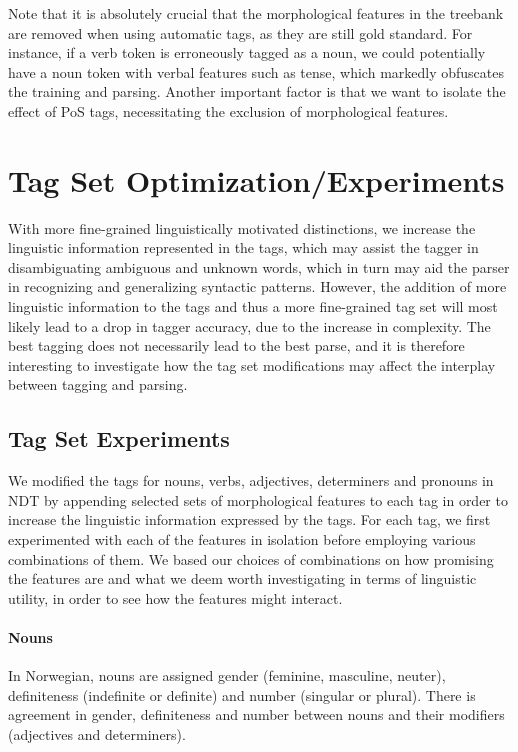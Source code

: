 \documentclass[11pt,a4paper]{article}
\begin{document}
Note that it is absolutely crucial that the morphological features in the
treebank are removed when using automatic tags, as they are still gold
standard. For instance, if a verb token is erroneously tagged as a noun, we
could potentially have a noun token with verbal features such as tense, which
markedly obfuscates the training and parsing. Another important factor is that
we want to isolate the effect of PoS tags, necessitating the exclusion of
morphological features.

\section{Tag Set Optimization/Experiments}
\label{sec:optimization}
With more fine-grained linguistically
motivated distinctions, we increase the linguistic information represented in
the tags, which may assist the tagger in disambiguating ambiguous and unknown
words, which in turn may aid the parser in recognizing and generalizing
syntactic patterns. However, the addition of more linguistic information to the
tags and thus a more fine-grained tag set will most likely lead to a drop in
tagger accuracy, due to the increase in complexity. The best tagging does not
necessarily lead to the best parse, and it is therefore interesting to
investigate how the tag set modifications may affect the interplay between
tagging and parsing.

\subsection{Tag Set Experiments}
We modified the tags for nouns, verbs, adjectives, determiners and pronouns in
NDT by appending selected sets of morphological features to each tag in order
to increase the linguistic information expressed by the tags.  For each tag, we
first experimented with each of the features in isolation before employing
various combinations of them. We based our choices of combinations on how
promising the features are and what we deem worth investigating in terms of
linguistic utility, in order to see how the features might interact.

\paragraph{Nouns}
In Norwegian, nouns are assigned gender (feminine, masculine, neuter),
definiteness (indefinite or definite) and number (singular or plural). There
is agreement in gender, definiteness and number between nouns and their
modifiers (adjectives and determiners).
\end{document}
